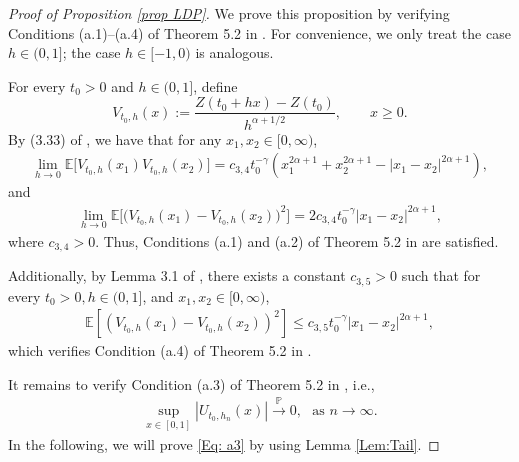 \documentclass[11pt, reqno]{amsart}
\numberwithin{equation}{section}
\newcommand{\1}{{\bf 1}}
\newcommand{\2}{{\bf 2}}
\begin{document}
\begin{proof}[Proof of Proposition \ref{prop LDP}] We prove this proposition   by  verifying Conditions (a.1)--(a.4) of Theorem 5.2 in   \cite{Arc}.
For convenience, we  only treat  the  case  $h\in (0,1]$; the case  $h\in [-1,0)$ is analogous. 

  For every   $t_0>0$ and   $h\in (0,1]$, define
  \begin{equation*}%
V_{t_0,h}(x) :=\frac{ Z(t_0+hx)-Z(t_0)}{h^{\alpha+1/2}}, \qquad  x\ge0.
 \end{equation*} 
By  (3.33) of   \cite{WX2021a},  we have that for any $x_1, x_2\in [0, \infty)$,
 \begin{align*}
  \lim_{h \rightarrow0}  \mathbb E\big[V_{t_0,h }(x_1) V_{t_0, {h}}(x_2)   \big] = c_{3,4} t_0^{-\gamma}
  \left(x_1^{2\alpha+1}+x_2^{2\alpha+1}-|x_1-x_2|^{2\alpha+1}  \right),
   \end{align*}
   and
 \begin{align*}
 \lim_{h \rightarrow0}    \mathbb E\Big[ \big(V_{t_0, h }(x_1)- V_{t_0, h }(x_2)\big)^2\Big]=2 c_{3,4}  t_0^{-\gamma} \left|x_1-x_2\right|^{2\alpha+1},
   \end{align*}
   where  $c_{3,4}>0$.
Thus,   Conditions (a.1) and (a.2) of Theorem 5.2 in  \cite{Arc} are satisfied.

Additionally,  by  Lemma 3.1 of \cite{WX2021a},  there exists a constant $c_{3,5}>0$ such that for every $t_0>0, h\in (0,1]$, and $x_1, x_2\in [0, \infty)$,
   \begin{align*}
   \mathbb E\left[ \left(V_{t_0, h}(x_1)- V_{t_0, h}(x_2)\right)^2\right]\le c_{3,5} t_0^{-\gamma} \left|x_1-x_2\right|^{2\alpha+1},
   \end{align*}
 which verifies   Condition  (a.4)  of  Theorem 5.2 in   \cite{Arc}.

It remains to verify Condition (a.3) of  Theorem 5.2 in   \cite{Arc}, i.e., 
\begin{align}\label{Eq: a3}
\sup_{x\in [0,1]}|U_{t_0, h_n}(x)| \stackrel{\mathbb P}{\longrightarrow} 0, \ \ \ \text{as } n\rightarrow\infty.
\end{align}
In the following,  we will prove \eqref{Eq: a3} by using   Lemma \ref{Lem:Tail}.


\end{proof}
\end{document}
